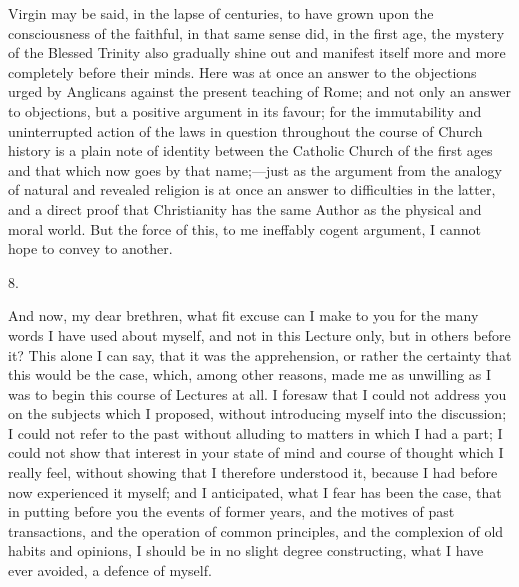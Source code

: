 Virgin may be said, in the lapse of centuries, to have grown upon the
consciousness of the faithful, in that same sense did, in the first
age, the mystery of the Blessed Trinity also gradually shine out and
manifest itself more and more completely before their minds. Here was
at once an answer to the objections urged by Anglicans against the
present teaching of Rome; and not only an answer to objections, but a
positive argument in its favour; for the immutability and
uninterrupted action of the laws in question throughout the course of
Church history is a plain note of identity between the Catholic Church
of the first ages and that which now goes by that name;—just as the
argument from the analogy of natural and revealed religion is at once
an answer to difficulties in the latter, and a direct proof that
Christianity has the same Author as the physical and moral world. But
the force of this, to me ineffably cogent argument, I cannot hope to
convey to another.

8.

And now, my dear brethren, what fit excuse can I make to you for
the many words I have used about myself, and not in this Lecture only,
but in others before it? This alone I can say, that it was the
apprehension, or rather the certainty that this would be the case,
which, among other reasons, made me as unwilling as I was to begin
this course of Lectures at all. I foresaw that I could not address you
on the subjects which I proposed, without introducing myself into the
discussion; I could not refer to the past without alluding to matters
in which I had a part; I could not show that interest in your state of
mind and course of thought which I really feel, without showing that I
therefore understood it, because I had before now experienced it
myself; and I anticipated, what I fear has been the case, that in
putting before you the events of former years, and the motives of past
transactions, and the operation of common principles, and the
complexion of old habits and opinions, I should be in no slight degree
constructing, what I have ever avoided, a defence of myself.

